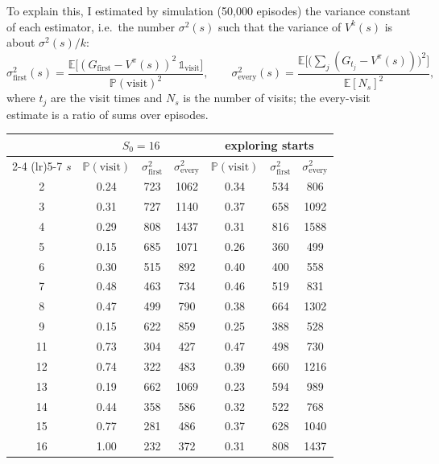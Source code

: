 \documentclass[letterpaper, 11pt]{article}
\newcommand{\pr}{\mathbb{P}}    %
\newcommand{\E}{\mathbb{E}}     %
\newcommand{\1}{\mathds{1}}	%
\theoremstyle{definition}
\begin{document}
To explain this, I estimated by simulation (50{,}000 episodes) the variance constant of each estimator, i.e.\ the number $\sigma^2(s)$ such that the variance of $V^k(s)$ is about $\sigma^2(s)/k$:
\[
\sigma^2_{\text{first}}(s) = \frac{\E\big[(G_{\text{first}} - V^\pi(s))^2\, \1_{\text{visit}}\big]}{\pr(\text{visit})^2},
\qquad
\sigma^2_{\text{every}}(s) = \frac{\E\Big[\big(\sum_j (G_{t_j} - V^\pi(s))\big)^2\Big]}{\E[N_s]^2},
\]
where $t_j$ are the visit times and $N_s$ is the number of visits; the every-visit estimate is a ratio of sums over episodes.
\begin{center}
\small
\begin{tabular}{c ccc ccc}
\toprule
 & \multicolumn{3}{c}{$S_0 = 16$} & \multicolumn{3}{c}{exploring starts} \\
\cmidrule(lr){2-4} \cmidrule(lr){5-7}
$s$ & $\pr(\text{visit})$ & $\sigma^2_{\text{first}}$ & $\sigma^2_{\text{every}}$ & $\pr(\text{visit})$ & $\sigma^2_{\text{first}}$ & $\sigma^2_{\text{every}}$ \\
\midrule
2  & 0.24 & 723 & 1062 & 0.34 & 534 & 806 \\
3  & 0.31 & 727 & 1140 & 0.37 & 658 & 1092 \\
4  & 0.29 & 808 & 1437 & 0.31 & 816 & 1588 \\
5  & 0.15 & 685 & 1071 & 0.26 & 360 & 499 \\
6  & 0.30 & 515 & 892  & 0.40 & 400 & 558 \\
7  & 0.48 & 463 & 734  & 0.46 & 519 & 831 \\
8  & 0.47 & 499 & 790  & 0.38 & 664 & 1302 \\
9  & 0.15 & 622 & 859  & 0.25 & 388 & 528 \\
11 & 0.73 & 304 & 427  & 0.47 & 498 & 730 \\
12 & 0.74 & 322 & 483  & 0.39 & 660 & 1216 \\
13 & 0.19 & 662 & 1069 & 0.23 & 594 & 989 \\
14 & 0.44 & 358 & 586  & 0.32 & 522 & 768 \\
15 & 0.77 & 281 & 486  & 0.37 & 628 & 1040 \\
16 & 1.00 & 232 & 372  & 0.31 & 808 & 1437 \\
\bottomrule
\end{tabular}
\end{center}
\end{document}
